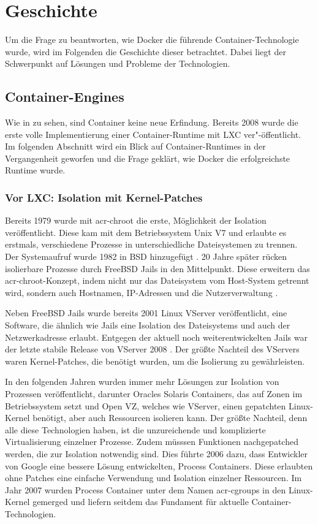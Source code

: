 \chapter{Geschichte}
\label{chap:geschichte}
Um die Frage zu beantworten, wie Docker die führende Container-Technologie wurde, wird im Folgenden die Geschichte dieser betrachtet. Dabei liegt der Schwerpunkt auf Lösungen und Probleme der Technologien.
 
\section{Container-Engines}
\label{sec:lxc2containerd}
Wie in  zu sehen, sind Container keine neue Erfindung. Bereits 2008 wurde die erste volle Implementierung einer Container-Runtime mit LXC ver"-öffentlicht. Im folgenden Abschnitt wird ein Blick auf Container-Runtimes in der Vergangenheit geworfen und die Frage geklärt, wie Docker die erfolgreichste Runtime wurde.

\subsection{Vor LXC: Isolation mit Kernel-Patches}
\label{sec:geschichteVorLXC}

Bereits 1979 wurde mit \gls{acr-chroot} die erste, Möglichkeit der Isolation veröffentlicht. Diese kam mit dem Betriebssystem Unix V7 und erlaubte es erstmals, verschiedene Prozesse in unterschiedliche Dateisystemen zu trennen. Der Systemaufruf wurde 1982 in BSD hinzugefügt \citep{ABriefHistoryofContainers:fromthe1970sto2017}. 20 Jahre später rücken isolierbare Prozesse durch FreeBSD Jails in den Mittelpunkt. Diese erweitern das \Gls{acr-chroot}-Konzept, indem nicht nur das Dateisystem vom Host-System getrennt wird, sondern auch Hostnamen, IP-Adressen und die Nutzerverwaltung \citep{FreeBSDHandbook}. 

Neben FreeBSD Jails wurde bereits 2001 Linux VServer veröffentlicht, eine Software, die ähnlich wie Jails eine Isolation des Dateisystems und auch der Netzwerkadresse erlaubt. Entgegen der aktuell noch weiterentwickelten Jails war der letzte stabile Release von VServer 2008 \citep{PaperLinuxVServer}. Der größte Nachteil des VServers waren Kernel-Patches, die benötigt wurden, um die Isolierung zu gewährleisten.

In den folgenden Jahren wurden immer mehr Lösungen zur Isolation von Prozessen veröffentlicht, darunter Oracles Solaris Containers, das auf Zonen im Betriebssystem setzt und Open VZ, welches wie VServer, einen gepatchten Linux-Kernel benötigt, aber auch Ressourcen isolieren kann. Der größte Nachteil, denn alle diese Technologien haben, ist die unzureichende und komplizierte Virtualisierung einzelner Prozesse. Zudem müsssen Funktionen nachgepatched werden, die zur Isolation notwendig sind. Dies führte 2006 dazu, dass Entwickler von Google eine bessere Lösung entwickelten, Process Containers. Diese erlaubten ohne Patches eine einfache Verwendung und Isolation einzelner Ressourcen. Im Jahr 2007 wurden Process Container unter dem Namen \glspl{acr-cgroup} in den Linux-Kernel gemerged und liefern seitdem das Fundament für aktuelle Container-Technologien.

